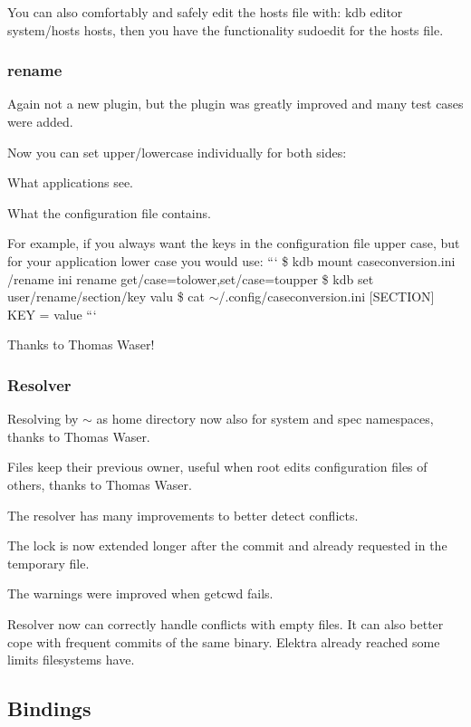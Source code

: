You can also comfortably and safely edit the hosts file with\+: {\ttfamily kdb editor system/hosts hosts}, then you have the functionality {\ttfamily sudoedit} for the hosts file.

\subsubsection*{rename}

Again not a new plugin, but the plugin was greatly improved and many test cases were added.

Now you can set upper/lowercase individually for both sides\+:


\begin{DoxyEnumerate}
\item What applications see.
\item What the configuration file contains.
\end{DoxyEnumerate}

For example, if you always want the keys in the configuration file upper case, but for your application lower case you would use\+: ``` \$ kdb mount caseconversion.\+ini /rename ini rename get/case=tolower,set/case=toupper \$ kdb set user/rename/section/key valu \$ cat $\sim$/.config/caseconversion.\+ini \mbox{[}S\+E\+C\+T\+I\+O\+N\mbox{]} K\+E\+Y = value ```

Thanks to Thomas Waser!

\subsubsection*{Resolver}

Resolving by $\sim$ as home directory now also for system and spec namespaces, thanks to Thomas Waser.

Files keep their previous owner, useful when root edits configuration files of others, thanks to Thomas Waser.

The resolver has many improvements to better detect conflicts.

The lock is now extended longer after the commit and already requested in the temporary file.

The warnings were improved when {\ttfamily getcwd} fails.

Resolver now can correctly handle conflicts with empty files. It can also better cope with frequent commits of the same binary. Elektra already reached some limits filesystems have.

\subsection*{Bindings}

